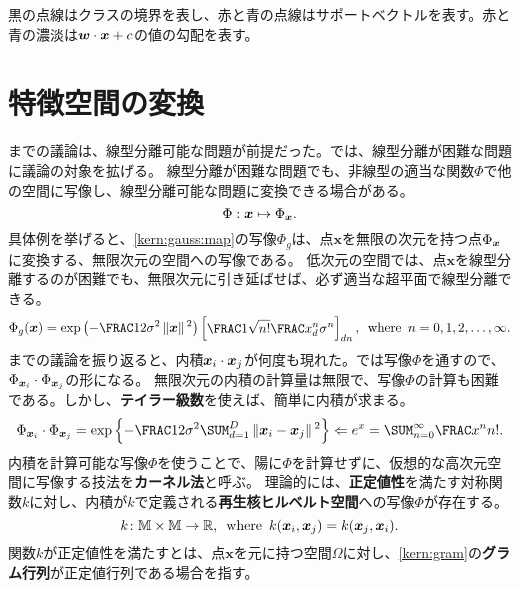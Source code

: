 \documentclass[10pt,a4paper]{book}
\begin{document}
黒の点線はクラスの境界を表し、赤と青の点線はサポートベクトルを表す。赤と青の濃淡は$\bm{w} \cdot \bm{x}+c$の値の勾配を表す。

\section{特徴空間の変換\label{sect:kernel}}

までの議論は、線型分離可能な問題が前提だった。では、線型分離が困難な問題に議論の対象を拡げる。
線型分離が困難な問題でも、非線型の適当な関数$\Phi$で他の空間に写像し、線型分離可能な問題に変換できる場合がある。
%
\begin{equation}
\label{eq:kern:map}
\Phi: \bm{x} \mapsto \Phi_{\bm{x}}.
\end{equation}
%
具体例を挙げると、\eqref{kern:gauss:map}の写像$\Phi_g$は、点$\bm{x}$を無限の次元を持つ点$\Phi_{\bm{x}}$に変換する、無限次元の空間への写像である。
低次元の空間では、点$\bm{x}$を線型分離するのが困難でも、無限次元に引き延ばせば、必ず適当な超平面で線型分離できる。
%
\begin{equation}
\label{eq:kern:gauss:map}
\Phi_g(\bm{x}) = \exp \tup{- \frac{1}{2\sigma^2} \norm{\bm{x}}^2}
\begin{bmatrix}
\frac{1}{\sqrt{n!}} \frac{x_d^n}{\sigma^n}
\end{bmatrix}_{dn},
\where
n = 0,1,2,\ldots,\infty.
\end{equation}
%
までの議論を振り返ると、内積$\bm{x}_i \cdot \bm{x}_j$が何度も現れた。では写像$\Phi$を通すので、$\Phi_{\bm{x}_{i}} \cdot \Phi_{\bm{x}_{j}}$の形になる。
無限次元の内積の計算量は無限で、写像$\Phi$の計算も困難である。しかし、\textbf{テイラー級数}を使えば、簡単に内積が求まる。
%
\begin{equation}
\label{eq:kern:gauss:dot}
\dprod{\Phix{i}}{\Phix{j}} =
\exp \seq{- \frac{1}{2\sigma^2} \sum_{d=1}^D \norm{\bm{x}_i-\bm{x}_j}^2}
\Leftarrow
e^x = \sum_{n=0}^\infty \frac{x^n}{n!}.
\end{equation}
%
内積を計算可能な写像$\Phi$を使うことで、陽に$\Phi$を計算せずに、仮想的な高次元空間に写像する技法を\textbf{カーネル法}と呼ぶ。
理論的には、\textbf{正定値性}を満たす対称関数$k$に対し、内積が$k$で定義される\textbf{再生核ヒルベルト空間}への写像$\Phi$が存在する。
%
\begin{equation}
\label{eq:kernel}
k \colon \mathbb{M} \times \mathbb{M} \to \mathbb{R},
\enspace\mathrm{where}\enspace
k(\bm{x}_i,\bm{x}_j) = k(\bm{x}_j,\bm{x}_i).
\end{equation}
%
関数$k$が正定値性を満たすとは、点$\bm{x}$を元に持つ空間$\Omega$に対し、\eqref{kern:gram}の\textbf{グラム行列}が正定値行列である場合を指す。
\end{document}

